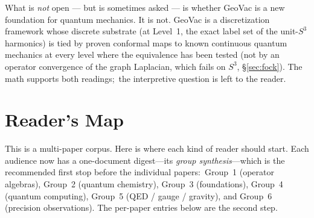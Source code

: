 \documentclass[11pt,a4paper]{article}
\newcommand{\sthree}{S^{3}}
\newcommand{\gvc}[2]{#2}
\begin{document}
What is \emph{not} open --- but is sometimes asked --- is whether
GeoVac is a new foundation for quantum mechanics.  It is not.  GeoVac
is a discretization framework whose discrete substrate (at Level~1, the
exact label set of the unit-$\sthree$ harmonics) is tied by proven
conformal maps to known continuous quantum mechanics at every level where
the equivalence has been tested (\gvc{graph-s3-wall}{not by an operator convergence of the
graph Laplacian, which fails on $\sthree$, \S\ref{sec:fock}}).  The math supports both readings;\
the interpretive question is left to the reader.

\section{Reader's Map}
\label{sec:readers_map}

This is a multi-paper corpus.  Here is where each kind of reader
should start.  Each audience now has a one-document digest---its
\emph{group synthesis}---which is the recommended first stop before
the individual papers:\ Group~1 (operator algebras), Group~2
(quantum chemistry), Group~3 (foundations), Group~4 (quantum
computing), Group~5 (QED / gauge / gravity), and Group~6 (precision
observations).  The per-paper entries below are the second step.
\end{document}
